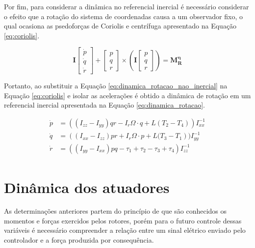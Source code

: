 \documentclass[main.tex]{subfiles}
\begin{document}
Por fim, para considerar a dinâmica no referencial inercial é necessário considerar o efeito que a rotação do sistema de coordenadas causa a um observador fixo, o qual ocasiona as psedoforças de Coriolis e centrífuga \cite{classica:livro} apresentado na Equação \ref{eq:coriolis}.

\begin{equation}\label{eq:coriolis}
	\boldsymbol{I}\begin{bmatrix}
		\dot{p}\\
		\dot{q}\\
		\dot{r}
	\end{bmatrix} + \begin{bmatrix}
		p\\
		q\\
		r
	\end{bmatrix}\times\left(\boldsymbol{I}\begin{bmatrix}
	p\\
	q\\
	r
	\end{bmatrix}\right) = \boldsymbol{M^\eta_R}
\end{equation}

Portanto, ao substituir a Equação \ref{eq:dinamica_rotacao_nao_inercial} na Equação \ref{eq:coriolis} e isolar as acelerações é obtido a dinâmica de rotação em um referencial inercial apresentada na Equação \ref{eq:dinamica_rotacao}.

\begin{equation}\label{eq:dinamica_rotacao}
	\begin{split}
		\dot{p} &= \left((I_{zz} - I_{yy})qr - I_r\Omega\cdot q + L(T_2 - T_4)\right)I_{xx}^{-1}\\
		\dot{q} &= \left((I_{xx} - I_{zz})pr + I_r\Omega\cdot p + L(T_3 - T_1\right))I_{yy}^{-1}\\
		\dot{r} &= \left((I_{yy} - I_{xx})pq -\tau_1 + \tau_2 - \tau_3 + \tau_4\right)I_{zz}^{-1}\\
	\end{split}
\end{equation}

\section{Dinâmica dos atuadores}

As determinações anteriores partem do princípio de que são conhecidos os momentos e forças exercidos pelos rotores, porém para o futuro controle dessas variáveis é necessário compreender a relação entre um sinal elétrico enviado pelo controlador e a força produzida por consequência.
\end{document}
